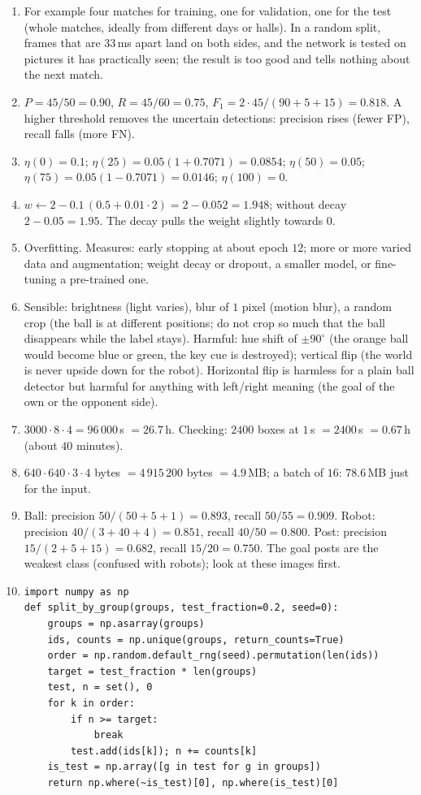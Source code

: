 \begin{enumerate}[label=\textbf{\ansnum.\arabic*}]
  \item For example four matches for training, one for validation, one for the test (whole matches, ideally from different days or halls). In a random split, frames that are $33$\,ms apart land on both sides, and the network is tested on pictures it has practically seen; the result is too good and tells nothing about the next match.
  \item $P=45/50=0.90$, $R=45/60=0.75$, $F_1=2\cdot45/(90+5+15)=0.818$. A higher threshold removes the uncertain detections: precision rises (fewer FP), recall falls (more FN).
  \item $\eta(0)=0.1$; $\eta(25)=0.05(1+0.7071)=0.0854$; $\eta(50)=0.05$; $\eta(75)=0.05(1-0.7071)=0.0146$; $\eta(100)=0$.
  \item $w\leftarrow2-0.1\,(0.5+0.01\cdot2)=2-0.052=1.948$; without decay $2-0.05=1.95$. The decay pulls the weight slightly towards $0$.
  \item Overfitting. Measures: early stopping at about epoch $12$; more or more varied data and augmentation; weight decay or dropout, a smaller model, or fine-tuning a pre-trained one.
  \item Sensible: brightness (light varies), blur of $1$ pixel (motion blur), a random crop (the ball is at different positions; do not crop so much that the ball disappears while the label stays). Harmful: hue shift of $\pm90^\circ$ (the orange ball would become blue or green, the key cue is destroyed); vertical flip (the world is never upside down for the robot). Horizontal flip is harmless for a plain ball detector but harmful for anything with left/right meaning (the goal of the own or the opponent side).
  \item $3000\cdot8\cdot4=96\,000$\,s $=26.7$\,h. Checking: $2400$ boxes at $1$\,s $=2400$\,s $=0.67$\,h (about $40$ minutes).
  \item $640\cdot640\cdot3\cdot4$ bytes $=4\,915\,200$ bytes $=4.9$\,MB; a batch of $16$: $78.6$\,MB just for the input.
  \item Ball: precision $50/(50+5+1)=0.893$, recall $50/55=0.909$. Robot: precision $40/(3+40+4)=0.851$, recall $40/50=0.800$. Post: precision $15/(2+5+15)=0.682$, recall $15/20=0.750$. The goal posts are the weakest class (confused with robots); look at these images first.
  \item[\textbf{\ansnum.10}]
\begin{verbatim}
import numpy as np
def split_by_group(groups, test_fraction=0.2, seed=0):
    groups = np.asarray(groups)
    ids, counts = np.unique(groups, return_counts=True)
    order = np.random.default_rng(seed).permutation(len(ids))
    target = test_fraction * len(groups)
    test, n = set(), 0
    for k in order:
        if n >= target:
            break
        test.add(ids[k]); n += counts[k]
    is_test = np.array([g in test for g in groups])
    return np.where(~is_test)[0], np.where(is_test)[0]


\end{verbatim}
\end{enumerate}
